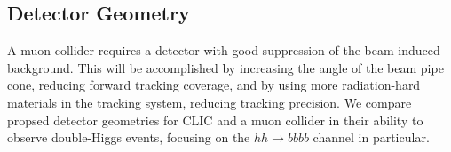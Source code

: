 \documentclass[12pt]{article}
\begin{document}



\subsection{Detector Geometry}
A muon collider requires a detector with good suppression of the beam-induced background. This will be accomplished by increasing the angle of the beam pipe cone, reducing forward tracking coverage, and by using more radiation-hard materials in the tracking system, reducing tracking precision. We compare propsed detector geometries for CLIC and a muon collider in their ability to observe double-Higgs events, focusing on the $hh\rightarrow b\bar{b}b\bar{b}$ channel in particular.

\end{document}
